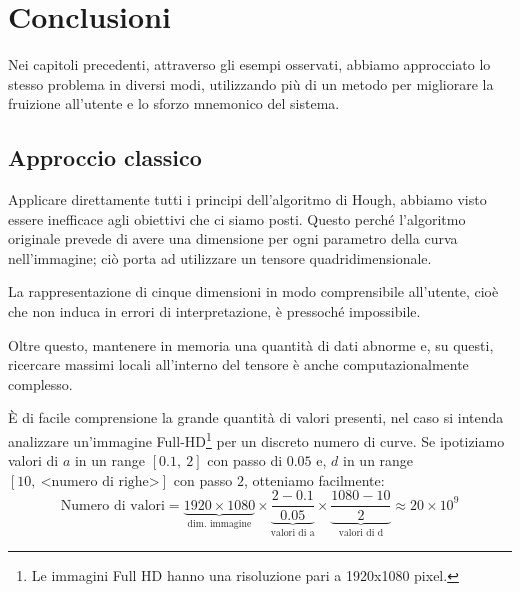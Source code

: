 \section{Conclusioni}
Nei capitoli precedenti, attraverso gli esempi osservati, abbiamo approcciato lo stesso problema in diversi modi, utilizzando più di un metodo per migliorare la fruizione all'utente e lo sforzo mnemonico del sistema.\par

\subsection{Approccio classico}\label{conclusioni_caso1}
Applicare direttamente tutti i principi dell'algoritmo di Hough, abbiamo visto essere inefficace agli obiettivi che ci siamo posti. Questo perché l'algoritmo originale prevede di avere una dimensione per ogni parametro della curva nell'immagine; ciò porta ad utilizzare un tensore quadridimensionale.\par
La rappresentazione di cinque dimensioni in modo comprensibile all'utente, cioè che non induca in errori di interpretazione, è pressoché impossibile.\par
Oltre questo, mantenere in memoria una quantità di dati abnorme e, su questi, ricercare massimi locali all'interno del tensore è anche computazionalmente complesso.\par
È di facile comprensione la grande quantità di valori presenti, nel caso si intenda analizzare un'immagine Full-HD\footnote{Le immagini Full HD hanno una risoluzione pari a 1920x1080 pixel.} per un discreto numero di curve. Se ipotiziamo valori di $a$ in un range $[0.1,\ 2]$ con passo di $0.05$ e, $d$ in un range $[10,\ \text{<numero di righe>}]$ con passo $2$, otteniamo facilmente:
$$\text{Numero di valori} = \underbrace{1920\times 1080}_{\text{dim. immagine}}\times\underbrace{\frac{2-0.1}{0.05}}_{\text{valori di a}}\times\underbrace{\frac{1080-10}{2}}_{\text{valori di d}}\approx 20\times10^9$$

